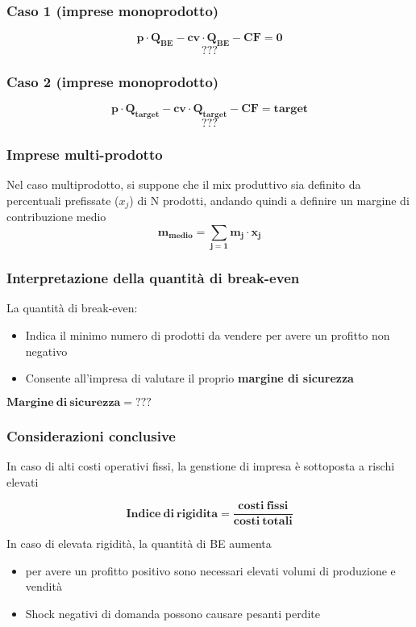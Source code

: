 \documentclass[../main.tex]{subfiles}
\begin{document}
\subsubsection{Caso 1 (imprese monoprodotto)}
$$\mathbf{p \cdot Q_{BE} - cv \cdot Q_{BE} - CF = 0}$$
$$\mathbf{???}$$

\subsubsection{Caso 2 (imprese monoprodotto)}
$$\mathbf{p \cdot Q_{target} - cv \cdot Q_{target} - CF = target}$$
$$\mathbf{???}$$

\subsubsection{Imprese multi-prodotto}
Nel caso multiprodotto, si suppone che il mix produttivo sia definito da percentuali prefissate ($x_j$) di N prodotti, andando quindi a definire un margine di contribuzione medio
$$\mathbf{m_{medio} = \sum_{j=1}m_j \cdot x_j}$$

\subsubsection{Interpretazione della quantità di break-even}

La quantità di break-even:
\begin{itemize}
    \item Indica il minimo numero di prodotti da vendere per avere un profitto non negativo
    \item Consente all'impresa di valutare il proprio \textbf{margine di sicurezza}
\end{itemize}

$\mathbf{Margine\ di\ sicurezza = ???}$

\subsubsection{Considerazioni conclusive}
In caso di alti costi operativi fissi, la genstione di impresa è sottoposta a rischi elevati

$$\mathbf{Indice\ di\ rigidita = \frac{costi\ fissi}{costi\ totali}}$$

In caso di elevata rigidità, la quantità di BE aumenta
\begin{itemize}
    \item per avere un profitto positivo sono necessari elevati volumi di produzione e vendità
    \item Shock negativi di domanda possono causare pesanti perdite
\end{itemize}
\end{document}
